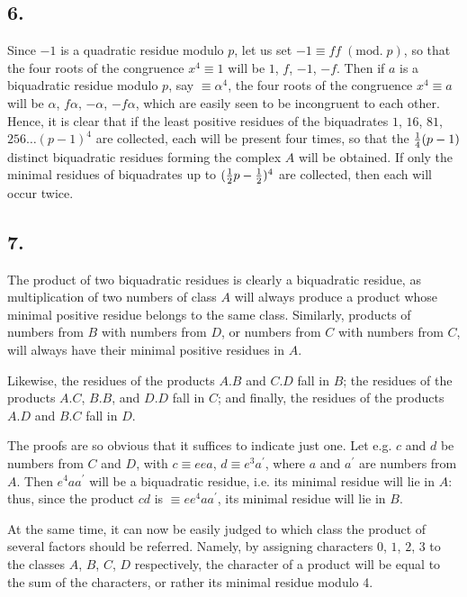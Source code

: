 \documentclass[twoside,12pt]{memoir}
\renewcommand{\pmod}[1]{\;(\textrm{mod.}\;#1)}
\let\oldfrac\frac
\def\frac#1#2{\mathchoice{\tfrac{#1}{#2}}{\oldfrac{#1}{#2}}{\genfrac{}{}{}{2}{#1}{#2\mathstrut}}{\genfrac{}{}{}{3}{#1}{#2\mathstrut}}}
\begin{document}
\subsection*{6.}

Since \(-1\) is a quadratic residue modulo \(p\), let us set \(-1 \equiv ff \pmod{p}\), so that the four roots of the congruence \(x^{4} \equiv 1\) will be \(1\), \(f\), \(-1\), \(-f\). Then if \(a\) is a biquadratic residue modulo \(p\), \pagebreak%
say \(\equiv \alpha^{4}\), the four roots of the congruence \(x^{4} \equiv a\) will be \(\alpha\), \(f \alpha\), \(-\alpha\), \(-f \alpha\), which are easily seen to be incongruent to each other. Hence, it is clear that if the least positive residues of the biquadrates \(1\), \(16\), \(81\), \(256 \ldots (p-1)^{4}\) are collected, each will be present four times, so that the \(\frac{1}{4}(p-1)\) distinct biquadratic residues forming the complex \(A\) will be obtained. If only the minimal residues of biquadrates up to \((\frac{1}{2} p-\frac{1}{2})^{4}\) are collected, then each will occur twice.

\subsection*{7.}

The product of two biquadratic residues is clearly a biquadratic residue, as multiplication of two numbers of class \(A\) will always produce a product whose minimal positive residue belongs to the same class. Similarly, products of numbers from \(B\) with numbers from \(D\), or numbers from \(C\) with numbers from \(C\), will always have their minimal positive residues in \(A\).

Likewise, the residues of the products \(A . B\) and \(C . D\) fall in \(B\); the residues of the products \(A . C\), \(B . B\), and \(D . D\) fall in \(C\); and finally, the residues of the products \(A . D\) and \(B . C\) fall in \(D\).

The proofs are so obvious that it suffices to indicate just one. Let e{.}g{.} \(c\) and \(d\) be numbers from \(C\) and \(D\), with \(c \equiv e ea\), \(d \equiv e^{3} a^{\prime}\), where \(a\) and \(a^{\prime}\) are numbers from \(A\). Then \(e^{4} a a^{\prime}\) will be a biquadratic residue, i{.}e{.} its minimal residue will lie in \(A\): thus, since the product \(c d\) is \(\equiv e e^{4} a a^{\prime}\), its minimal residue will lie in \(B\).

At the same time, it can now be easily judged to which class the product of several factors should be referred. Namely, by assigning characters \(0\), \(1\), \(2\), \(3\) to the classes \(A\), \(B\), \(C\), \(D\) respectively, the character of a product will be equal to the sum of the characters, or rather its minimal residue modulo 4.
\end{document}
